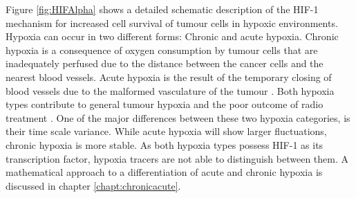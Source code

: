 Figure \ref{fig:HIFAlpha} shows a detailed schematic description of the HIF-1 mechanism for increased cell survival of tumour cells in hypoxic environments. Hypoxia can occur in two different forms: Chronic and acute hypoxia. Chronic hypoxia is a consequence of oxygen consumption by tumour cells that are inadequately perfused due to the distance between the cancer cells and the nearest blood vessels. Acute hypoxia is the result of the temporary closing of blood vessels due to the malformed vasculature of the tumour \cite{Simon}. Both hypoxia types contribute to general tumour hypoxia and the poor outcome of radio treatment \cite{pmid14516104}. One of the major differences between these two hypoxia categories, is their time scale variance. While acute hypoxia will show larger fluctuations, chronic hypoxia is more stable. As both hypoxia types possess HIF-1 as its transcription factor, hypoxia tracers are not able to distinguish between them. A mathematical approach to a differentiation of acute and chronic hypoxia is discussed in chapter \ref{chapt:chronicacute}.
